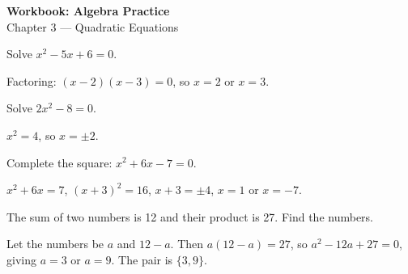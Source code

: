 \documentclass[12pt,answers,addpoints]{exam}
\begin{document}
\begin{center}
  {\bfseries\Large Workbook: Algebra Practice}\\[0.2cm]
  Chapter 3 --- Quadratic Equations
\end{center}

\begin{questions}

\question[5] Solve $x^2 - 5x + 6 = 0$.

\begin{solution}
Factoring: $(x-2)(x-3) = 0$, so $x = 2$ or $x = 3$.
\end{solution}

\question[5] Solve $2x^2 - 8 = 0$.

\begin{solution}
$x^2 = 4$, so $x = \pm 2$.
\end{solution}

\question[10] Complete the square: $x^2 + 6x - 7 = 0$.

\begin{solution}
$x^2 + 6x = 7$, $(x+3)^2 = 16$, $x + 3 = \pm 4$, $x = 1$ or $x = -7$.
\end{solution}

\question[10] The sum of two numbers is 12 and their product is 27. Find the numbers.

\begin{solution}
Let the numbers be $a$ and $12-a$. Then $a(12-a) = 27$, so $a^2 - 12a + 27 = 0$, giving $a = 3$ or $a = 9$. The pair is $\{3, 9\}$.
\end{solution}

\end{questions}
\end{document}
